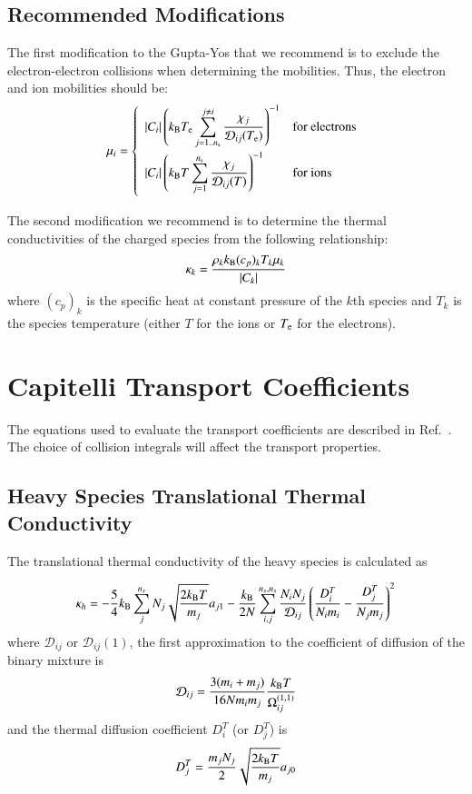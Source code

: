 \documentclass{warpdoc}
\newcommand{\alb}{\vspace{0.1cm}\\} %
\newcommand{\mfd}{\displaystyle}
\begin{document}
\subsection{Recommended Modifications}

The first modification to the Gupta-Yos that we recommend is to exclude the electron-electron collisions when determining the mobilities. Thus, the electron and ion mobilities should be:
%
\begin{equation}
 \mu_i= \left\{\begin{array}{ll}
   \mfd  |C_i| \left( k_{\rm B} T_{\rm e} \sum_{j=1..n_{\rm s}}^{j\neq i} \frac{\chi_j}{{\cal D}_{ij}(T_{\rm e})}\right)^{-1} & \textrm{for electrons} \alb
    \mfd  |C_i| \left( k_{\rm B} T \sum_{j=1}^{n_{\rm s}} \frac{\chi_j}{{\cal D}_{ij}(T)}\right)^{-1} & \textrm{for ions} \alb
 \end{array} \right.
\end{equation}
%

The second modification we recommend is to determine the thermal conductivities of the charged species from the following relationship:
%
\begin{equation}
  \kappa_k = \frac{\rho_k k_{\rm B} (c_p)_k T_k \mu_k}{|C_k|}    
\end{equation}
%
where $(c_p)_k$ is the specific heat at constant pressure of the $k$th species and $T_k$ is the species temperature (either $T$ for the ions or $T_{\rm e}$ for the electrons).
\section{Capitelli Transport Coefficients}

The equations used to evaluate the transport coefficients are described in Ref.\ \cite{tepjd:2000:capitelli}. The choice of collision integrals will affect the transport properties. 
\subsection{Heavy Species Translational Thermal Conductivity}

The translational thermal conductivity of the heavy species is calculated as

\begin{equation}\label{eq:heavykappa}
  \kappa_h=-\frac{5}{4}k_{\rm B}\sum_{j}^{n_s} N_{j}\sqrt{\frac{2k_{\rm B}T}{m_j}}a_{j1}-\frac{k_{\rm B}}{2N}\sum_{i,j}^{n_s,n_s}\frac{N_{i}N_{j}}{\mathcal{D}_{i j}}\left(\frac{D_{i}^{T}}{N_{i}m_{i}}-\frac{D_{j}^{T}}{N_{j}m_{j}}\right)^{2}
\end{equation}
where $\mathcal{D}_{i j}$ or $\mathcal{D}_{i j}(1)$, the first approximation to the coefficient of diffusion of the binary mixture is
\begin{equation}
  {\cal D}_{ij}=\frac{3(m_i+m_j)}{16N m_i m_j}\frac{k_{\rm B}T}{\Omega_{ij}^{(1,1)}}
\end{equation}
and the thermal diffusion coefficient $D_i^T$ (or $D_j^T$) is
\begin{equation}\label{eq:Tdiffcoeff}
  D_j^T=\frac{m_j N_j}{2}\sqrt{\frac{2 k_{\rm B} T}{m_j}}a_{j0}
\end{equation}
\end{document}
